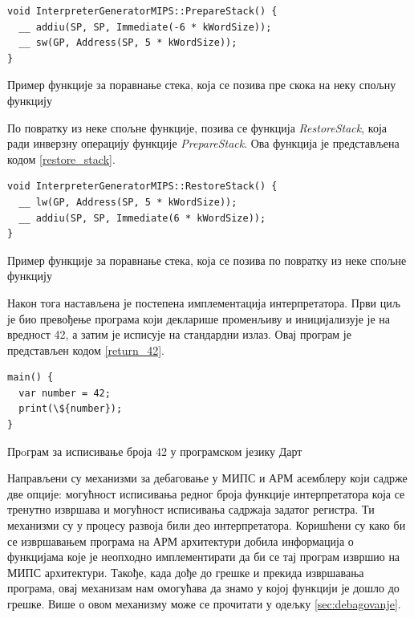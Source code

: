 \documentclass[12pt,oneside]{memoir}
\begin{document}
\begin{listing}
\begin{verbatim}
void InterpreterGeneratorMIPS::PrepareStack() {
  __ addiu(SP, SP, Immediate(-6 * kWordSize));
  __ sw(GP, Address(SP, 5 * kWordSize));
}
\end{verbatim}
\caption{Пример функције за поравнање стека, која се позива пре скока на неку спољну функцију}
\label{prepare_stack}
\end{listing}

По повратку из неке спољне функције, позива се функција \textit{RestoreStack}, која ради инверзну операцију функције \textit{PrepareStack}. Ова функција је представљена кодом \ref{restore_stack}.\\

\begin{listing}
\begin{verbatim}
void InterpreterGeneratorMIPS::RestoreStack() {
  __ lw(GP, Address(SP, 5 * kWordSize));
  __ addiu(SP, SP, Immediate(6 * kWordSize));
}
\end{verbatim}
\caption{Пример функције за поравнање стека, која се позива по повратку из неке спољне функцију}
\label{restore_stack}
\end{listing}

Након тога настављена је постепена имплементација интерпретатора. Први циљ је био превођење програма који декларише променљиву и иницијализује је на вредност 42, а затим је исписује на стандардни излаз. Овај програм је представљен кодом \ref{return_42}.\\

\begin{listing}
\begin{verbatim}
main() {
  var number = 42;
  print(\${number});
}
\end{verbatim}
\caption{Прoграм за исписивање броја 42 у програмском језику Дарт}
\label{return_42}
\end{listing}

Направљени су механизми за дебаговање у МИПС и АРМ асемблеру који садрже две опције: могућност исписивања редног броја функције интерпретатора која се тренутно извршава и могућност исписивања садржаја задатог регистра. Ти механизми су у процесу развоја били део интерпретатора. Коришћени су како би се извршавањем програма на АРМ архитектури добила информација о функцијама које је неопходно имплементирати да би се тај програм извршио на МИПС архитектури. Такође, када дође до грешке и прекида извршавања програма, овај механизам нам омогућава да знамо у којој функцији је дошло до грешке. Више о овом механизму може се прочитати у одељку \ref{sec:debagovanje}.
\end{document}
